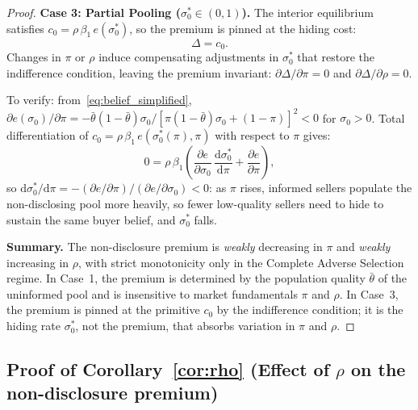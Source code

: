 \documentclass[10pt,letterpaper]{bp-template-concise}
\begin{document}
\begin{proof}
\medskip
\textbf{Case 3: Partial Pooling ($\sigma_0^*\in(0,1)$).}
The interior equilibrium satisfies $c_0=\rho\,\beta_1\,e(\sigma_0^*)$, so the premium is pinned at the hiding cost:
\begin{equation}
    \Delta = c_0.
\end{equation}
Changes in $\pi$ or $\rho$ induce compensating adjustments in $\sigma_0^*$ that restore the indifference condition, leaving the premium invariant: $\partial\Delta/\partial\pi=0$ and $\partial\Delta/\partial\rho=0$.

To verify: from~\eqref{eq:belief_simplified}, $\partial e(\sigma_0)/\partial\pi = -\bar{\theta}(1-\bar{\theta})\sigma_0/[\pi(1-\bar{\theta})\sigma_0+(1-\pi)]^2 < 0$ for $\sigma_0>0$. Total differentiation of $c_0=\rho\,\beta_1\,e(\sigma_0^*(\pi),\pi)$ with respect to $\pi$ gives:
\begin{equation}
    0 = \rho\,\beta_1\left(\frac{\partial e}{\partial\sigma_0}\,\frac{\mathrm{d}\sigma_0^*}{\mathrm{d}\pi} + \frac{\partial e}{\partial\pi}\right),
\end{equation}
so $\mathrm{d}\sigma_0^*/\mathrm{d}\pi = -(\partial e/\partial\pi)/(\partial e/\partial\sigma_0) < 0$: as $\pi$ rises, informed sellers populate the non-disclosing pool more heavily, so fewer low-quality sellers need to hide to sustain the same buyer belief, and $\sigma_0^*$ falls.

\medskip
\textbf{Summary.} The non-disclosure premium is \emph{weakly} decreasing in $\pi$ and \emph{weakly} increasing in $\rho$, with strict monotonicity only in the Complete Adverse Selection regime. In Case~1, the premium is determined by the population quality $\bar{\theta}$ of the uninformed pool and is insensitive to market fundamentals $\pi$ and $\rho$. In Case~3, the premium is pinned at the primitive $c_0$ by the indifference condition; it is the hiding rate $\sigma_0^*$, not the premium, that absorbs variation in $\pi$ and $\rho$.
\end{proof}

\subsection*{Proof of Corollary~\ref{cor:rho} (Effect of $\rho$ on the non-disclosure premium)}
\end{document}
